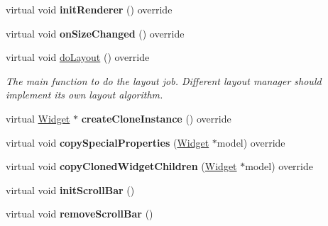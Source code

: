 \begin{DoxyCompactItemize}
\item 
\mbox{\label{classui_1_1ScrollView_a913a1734a2f5b02bb6b885cb6dd05a3d}} 
virtual void {\bfseries init\+Renderer} () override
\item 
\mbox{\label{classui_1_1ScrollView_a3f96a9fe3897267e64f82e41d9479163}} 
virtual void {\bfseries on\+Size\+Changed} () override
\item 
\mbox{\label{classui_1_1ScrollView_a39896112fc61689fbaaa712e614332a3}} 
virtual void \hyperlink{classui_1_1ScrollView_a39896112fc61689fbaaa712e614332a3}{do\+Layout} () override
\begin{DoxyCompactList}\small\item\em The main function to do the layout job. Different layout manager should implement its own layout algorithm. \end{DoxyCompactList}\item 
\mbox{\label{classui_1_1ScrollView_a6393fb82663f7f9f2c37b6da0ec26bf5}} 
virtual \hyperlink{classui_1_1Widget}{Widget} $\ast$ {\bfseries create\+Clone\+Instance} () override
\item 
\mbox{\label{classui_1_1ScrollView_a21ef2c658174830e679e95d30dd3756b}} 
virtual void {\bfseries copy\+Special\+Properties} (\hyperlink{classui_1_1Widget}{Widget} $\ast$model) override
\item 
\mbox{\label{classui_1_1ScrollView_a747202435fabb483cbf10f1b54edc47b}} 
virtual void {\bfseries copy\+Cloned\+Widget\+Children} (\hyperlink{classui_1_1Widget}{Widget} $\ast$model) override
\item 
\mbox{\label{classui_1_1ScrollView_a6fa4518e760d659868cbb1d32e267db9}} 
virtual void {\bfseries init\+Scroll\+Bar} ()
\item 
\mbox{\label{classui_1_1ScrollView_a303184412f263aec4778ab8f75f12b48}} 
virtual void {\bfseries remove\+Scroll\+Bar} ()
\item 
\mbox{\label{classui_1_1ScrollView_a5fb0b8d235953ce4f88ab53d669e4e5d}} 

\end{DoxyCompactItemize}
